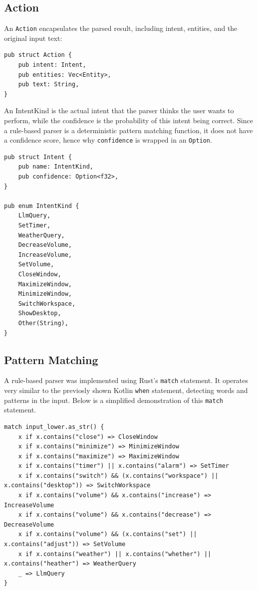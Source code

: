 \subsection{Action}
An \texttt{Action} encapsulates the parsed result, including intent, entities, and the original input text:

\begin{verbatim}
pub struct Action {
    pub intent: Intent,
    pub entities: Vec<Entity>,
    pub text: String,
}
\end{verbatim}

An IntentKind is the actual intent that the parser thinks the user wants to perform, while the confidence
is the probability of this intent being correct. Since a rule-based parser is a deterministic pattern matching function,
it does not have a confidence score, hence why \texttt{confidence} is wrapped in an \texttt{Option}.

\begin{verbatim}
pub struct Intent {
    pub name: IntentKind,
    pub confidence: Option<f32>,
}

pub enum IntentKind {
    LlmQuery,
    SetTimer,
    WeatherQuery,
    DecreaseVolume,
    IncreaseVolume,
    SetVolume,
    CloseWindow,
    MaximizeWindow,
    MinimizeWindow,
    SwitchWorkspace,
    ShowDesktop,
    Other(String),
}
\end{verbatim}

\subsection{Pattern Matching}
A rule-based parser was implemented using Rust's \texttt{match} statement.
It operates very similar to the previosly shown Kotlin \texttt{when} statement, detecting words and patterns in the input.
Below is a simplified demonstration of this \texttt{match} statement.

\begin{verbatim}
match input_lower.as_str() {
    x if x.contains("close") => CloseWindow
    x if x.contains("minimize") => MinimizeWindow
    x if x.contains("maximize") => MaximizeWindow
    x if x.contains("timer") || x.contains("alarm") => SetTimer
    x if x.contains("switch") && (x.contains("workspace") || x.contains("desktop")) => SwitchWorkspace
    x if x.contains("volume") && x.contains("increase") => IncreaseVolume
    x if x.contains("volume") && x.contains("decrease") => DecreaseVolume
    x if x.contains("volume") && (x.contains("set") || x.contains("adjust")) => SetVolume
    x if x.contains("weather") || x.contains("whether") || x.contains("heather") => WeatherQuery
    _ => LlmQuery
}
\end{verbatim}

